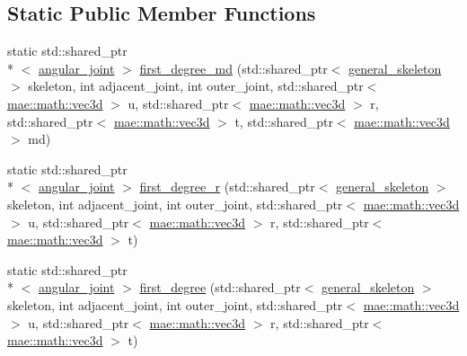\subsection*{Static Public Member Functions}
\begin{DoxyCompactItemize}
\item 
static std\-::shared\-\_\-ptr\\*
$<$ \hyperlink{classmae_1_1fl_1_1angular__joint}{angular\-\_\-joint} $>$ \hyperlink{classmae_1_1fl_1_1angular__skeleton__controller_a1cdea412c3d1a6cc585b2120f85abab4}{first\-\_\-degree\-\_\-md} (std\-::shared\-\_\-ptr$<$ \hyperlink{classmae_1_1general__skeleton}{general\-\_\-skeleton} $>$ skeleton, int adjacent\-\_\-joint, int outer\-\_\-joint, std\-::shared\-\_\-ptr$<$ \hyperlink{classmae_1_1math_1_1vec3d}{mae\-::math\-::vec3d} $>$ u, std\-::shared\-\_\-ptr$<$ \hyperlink{classmae_1_1math_1_1vec3d}{mae\-::math\-::vec3d} $>$ r, std\-::shared\-\_\-ptr$<$ \hyperlink{classmae_1_1math_1_1vec3d}{mae\-::math\-::vec3d} $>$ t, std\-::shared\-\_\-ptr$<$ \hyperlink{classmae_1_1math_1_1vec3d}{mae\-::math\-::vec3d} $>$ md)
\item 
static std\-::shared\-\_\-ptr\\*
$<$ \hyperlink{classmae_1_1fl_1_1angular__joint}{angular\-\_\-joint} $>$ \hyperlink{classmae_1_1fl_1_1angular__skeleton__controller_a3066e2bb6094c483f772c09facf05259}{first\-\_\-degree\-\_\-r} (std\-::shared\-\_\-ptr$<$ \hyperlink{classmae_1_1general__skeleton}{general\-\_\-skeleton} $>$ skeleton, int adjacent\-\_\-joint, int outer\-\_\-joint, std\-::shared\-\_\-ptr$<$ \hyperlink{classmae_1_1math_1_1vec3d}{mae\-::math\-::vec3d} $>$ u, std\-::shared\-\_\-ptr$<$ \hyperlink{classmae_1_1math_1_1vec3d}{mae\-::math\-::vec3d} $>$ r, std\-::shared\-\_\-ptr$<$ \hyperlink{classmae_1_1math_1_1vec3d}{mae\-::math\-::vec3d} $>$ t)
\item 
static std\-::shared\-\_\-ptr\\*
$<$ \hyperlink{classmae_1_1fl_1_1angular__joint}{angular\-\_\-joint} $>$ \hyperlink{classmae_1_1fl_1_1angular__skeleton__controller_ad1ab68acaaf4101ca13c2b50c639ed0a}{first\-\_\-degree} (std\-::shared\-\_\-ptr$<$ \hyperlink{classmae_1_1general__skeleton}{general\-\_\-skeleton} $>$ skeleton, int adjacent\-\_\-joint, int outer\-\_\-joint, std\-::shared\-\_\-ptr$<$ \hyperlink{classmae_1_1math_1_1vec3d}{mae\-::math\-::vec3d} $>$ u, std\-::shared\-\_\-ptr$<$ \hyperlink{classmae_1_1math_1_1vec3d}{mae\-::math\-::vec3d} $>$ r, std\-::shared\-\_\-ptr$<$ \hyperlink{classmae_1_1math_1_1vec3d}{mae\-::math\-::vec3d} $>$ t)
\item 

\end{DoxyCompactItemize}
